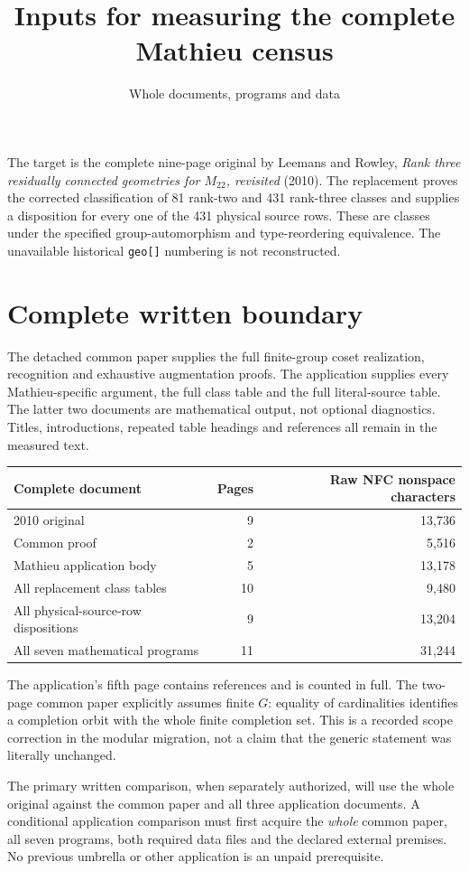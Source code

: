 \documentclass[11pt,a4paper]{article}
\title{Inputs for measuring the complete Mathieu census}
\author{Whole documents, programs and data}
\date{}
\begin{document}
\maketitle
The target is the complete nine-page original by Leemans and Rowley, \emph{Rank three residually connected geometries for $M_{22}$, revisited} (2010). The replacement proves the corrected classification of 81 rank-two and 431 rank-three classes and supplies a disposition for every one of the 431 physical source rows. These are classes under the specified group-automorphism and type-reordering equivalence. The unavailable historical \texttt{geo[]} numbering is not reconstructed.

\section*{Complete written boundary}
The detached common paper supplies the full finite-group coset realization, recognition and exhaustive augmentation proofs. The application supplies every Mathieu-specific argument, the full class table and the full literal-source table. The latter two documents are mathematical output, not optional diagnostics. Titles, introductions, repeated table headings and references all remain in the measured text.
\begin{center}
\begin{tabular}{lrr}
\toprule
Complete document&Pages&Raw NFC nonspace characters\\\midrule
2010 original&9&13,736\\
Common proof&2&5,516\\
Mathieu application body&5&13,178\\
All replacement class tables&10&9,480\\
All physical-source-row dispositions&9&13,204\\
All seven mathematical programs&11&31,244\\\bottomrule
\end{tabular}
\end{center}
The application's fifth page contains references and is counted in full. The two-page common paper explicitly assumes finite $G$: equality of cardinalities identifies a completion orbit with the whole finite completion set. This is a recorded scope correction in the modular migration, not a claim that the generic statement was literally unchanged.

The primary written comparison, when separately authorized, will use the whole original against the common paper and all three application documents. A conditional application comparison must first acquire the \emph{whole} common paper, all seven programs, both required data files and the declared external premises. No previous umbrella or other application is an unpaid prerequisite.
\end{document}

